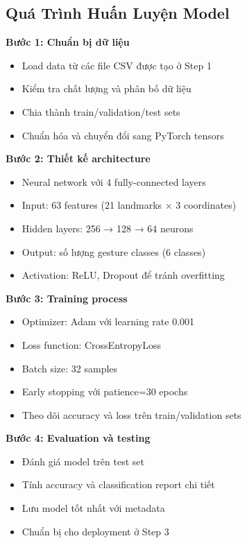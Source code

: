 \subsection{Quá Trình Huấn Luyện Model}

\textbf{Bước 1: Chuẩn bị dữ liệu}
\begin{itemize}
    \item Load data từ các file CSV được tạo ở Step 1
    \item Kiểm tra chất lượng và phân bố dữ liệu
    \item Chia thành train/validation/test sets
    \item Chuẩn hóa và chuyển đổi sang PyTorch tensors
\end{itemize}

\textbf{Bước 2: Thiết kế architecture}
\begin{itemize}
    \item Neural network với 4 fully-connected layers
    \item Input: 63 features (21 landmarks × 3 coordinates)
    \item Hidden layers: 256 → 128 → 64 neurons
    \item Output: số lượng gesture classes (6 classes)
    \item Activation: ReLU, Dropout để tránh overfitting
\end{itemize}

\textbf{Bước 3: Training process}
\begin{itemize}
    \item Optimizer: Adam với learning rate 0.001
    \item Loss function: CrossEntropyLoss
    \item Batch size: 32 samples
    \item Early stopping với patience=30 epochs
    \item Theo dõi accuracy và loss trên train/validation sets
\end{itemize}

\textbf{Bước 4: Evaluation và testing}
\begin{itemize}
    \item Đánh giá model trên test set
    \item Tính accuracy và classification report chi tiết
    \item Lưu model tốt nhất với metadata
    \item Chuẩn bị cho deployment ở Step 3
\end{itemize}

